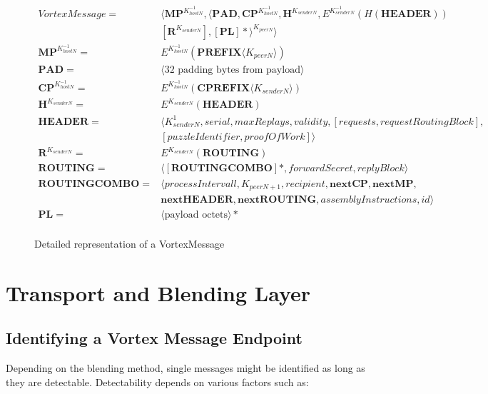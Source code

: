 \begin{figure*}[!h]
	\begin{align}
	VortexMessage                = &\langle \mathbf{MP}^{K^{-1}_{hostN}}, \langle\mathbf{PAD}, \mathbf{CP}^{K^{-1}_{hostN}}, \mathbf{H}^{K_{senderN}}, E^{K^{-1}_{senderN}}\left(H\left(\mathbf{HEADER}\right)\right)  \nonumber \\
	& \left[\mathbf{R}^{K_{senderN}}\right], \left[\mathbf{PL}\right]*\rangle^{K_{peerN}} \rangle\label{eq:vortexMessage}\\ 
	\mathbf{MP}^{K^{-1}_{hostN}}  = &E^{K^{-1}_{hostN}}\left(\mathbf{PREFIX}\langle K_{peerN}\rangle \right)\\ 
	\mathbf{PAD}                 = &\langle \text{32 padding bytes from payload} \rangle\\ 
	\mathbf{CP}^{K^{-1}_{hostN}} = &E^{K^{-1}_{hostN}}\left(\mathbf{CPREFIX}\langle K_{senderN}\rangle \right)\\ 
	\mathbf{H}^{K_{senderN}}     = &E^{K_{senderN}}\left(\mathbf{HEADER}\right)\\  
	\mathbf{HEADER}              = &\langle K^{1}_{senderN}, serial, maxReplays, validity, [requests, requestRoutingBlock],\nonumber\\ 
	& [puzzleIdentifier, proofOfWork] \rangle \\  
	\mathbf{R}^{K_{senderN}}     = & E^{K_{senderN}}\left(\mathbf{ROUTING}\right)\\ 
	\mathbf{ROUTING}             = & \langle [ \mathbf{ROUTINGCOMBO} ] *, forwardSecret, replyBlock \rangle\\  
	\mathbf{ROUTINGCOMBO}        = & \langle processIntervall, K_{peerN+1}, recipient, \mathbf{nextCP}, \mathbf{nextMP}, \nonumber \\
	& \mathbf{nextHEADER}, \mathbf{nextROUTING}, assemblyInstructions, id \rangle\\
	\mathbf{PL}                  = &\langle \text{payload octets} \rangle *\\ 
	\end{align}
	\captionsetup{labelformat=empty}
	\caption{Detailed representation of a VortexMessage}
\end{figure*}

\section{Transport and Blending Layer}

\subsection{Identifying a Vortex Message Endpoint}
Depending on the blending method, single messages might be identified as long as they are detectable. Detectability depends on various factors such as:

